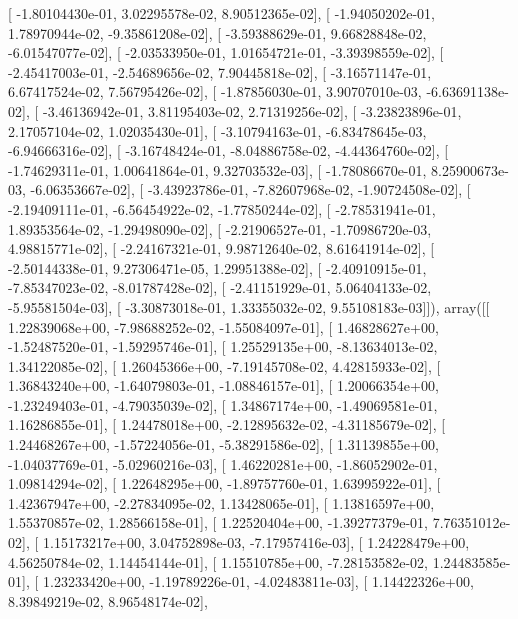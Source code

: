\documentclass{article}
\begin{document}
       [ -1.80104430e-01,   3.02295578e-02,   8.90512365e-02],
       [ -1.94050202e-01,   1.78970944e-02,  -9.35861208e-02],
       [ -3.59388629e-01,   9.66828848e-02,  -6.01547077e-02],
       [ -2.03533950e-01,   1.01654721e-01,  -3.39398559e-02],
       [ -2.45417003e-01,  -2.54689656e-02,   7.90445818e-02],
       [ -3.16571147e-01,   6.67417524e-02,   7.56795426e-02],
       [ -1.87856030e-01,   3.90707010e-03,  -6.63691138e-02],
       [ -3.46136942e-01,   3.81195403e-02,   2.71319256e-02],
       [ -3.23823896e-01,   2.17057104e-02,   1.02035430e-01],
       [ -3.10794163e-01,  -6.83478645e-03,  -6.94666316e-02],
       [ -3.16748424e-01,  -8.04886758e-02,  -4.44364760e-02],
       [ -1.74629311e-01,   1.00641864e-01,   9.32703532e-03],
       [ -1.78086670e-01,   8.25900673e-03,  -6.06353667e-02],
       [ -3.43923786e-01,  -7.82607968e-02,  -1.90724508e-02],
       [ -2.19409111e-01,  -6.56454922e-02,  -1.77850244e-02],
       [ -2.78531941e-01,   1.89353564e-02,  -1.29498090e-02],
       [ -2.21906527e-01,  -1.70986720e-03,   4.98815771e-02],
       [ -2.24167321e-01,   9.98712640e-02,   8.61641914e-02],
       [ -2.50144338e-01,   9.27306471e-05,   1.29951388e-02],
       [ -2.40910915e-01,  -7.85347023e-02,  -8.01787428e-02],
       [ -2.41151929e-01,   5.06404133e-02,  -5.95581504e-03],
       [ -3.30873018e-01,   1.33355032e-02,   9.55108183e-03]]), array([[  1.22839068e+00,  -7.98688252e-02,  -1.55084097e-01],
       [  1.46828627e+00,  -1.52487520e-01,  -1.59295746e-01],
       [  1.25529135e+00,  -8.13634013e-02,   1.34122085e-02],
       [  1.26045366e+00,  -7.19145708e-02,   4.42815933e-02],
       [  1.36843240e+00,  -1.64079803e-01,  -1.08846157e-01],
       [  1.20066354e+00,  -1.23249403e-01,  -4.79035039e-02],
       [  1.34867174e+00,  -1.49069581e-01,   1.16286855e-01],
       [  1.24478018e+00,  -2.12895632e-02,  -4.31185679e-02],
       [  1.24468267e+00,  -1.57224056e-01,  -5.38291586e-02],
       [  1.31139855e+00,  -1.04037769e-01,  -5.02960216e-03],
       [  1.46220281e+00,  -1.86052902e-01,   1.09814294e-02],
       [  1.22648295e+00,  -1.89757760e-01,   1.63995922e-01],
       [  1.42367947e+00,  -2.27834095e-02,   1.13428065e-01],
       [  1.13816597e+00,   1.55370857e-02,   1.28566158e-01],
       [  1.22520404e+00,  -1.39277379e-01,   7.76351012e-02],
       [  1.15173217e+00,   3.04752898e-03,  -7.17957416e-03],
       [  1.24228479e+00,   4.56250784e-02,   1.14454144e-01],
       [  1.15510785e+00,  -7.28153582e-02,   1.24483585e-01],
       [  1.23233420e+00,  -1.19789226e-01,  -4.02483811e-03],
       [  1.14422326e+00,   8.39849219e-02,   8.96548174e-02],
\end{document}
